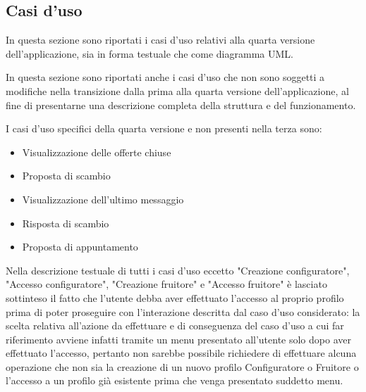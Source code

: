 \subsection{Casi d'uso}
In questa sezione sono riportati i casi d'uso relativi alla quarta versione dell'applicazione, sia in forma testuale che come diagramma UML.\bigskip 

In questa sezione sono riportati anche i casi d'uso che non sono soggetti a modifiche nella transizione dalla prima alla quarta versione dell'applicazione, al fine di presentarne una descrizione completa della struttura e del funzionamento.\bigskip

I casi d'uso specifici della quarta versione e non presenti nella terza sono:
\begin{itemize}
    \item Visualizzazione delle offerte chiuse
    \item Proposta di scambio
    \item Visualizzazione dell'ultimo messaggio
    \item Risposta di scambio
    \item Proposta di appuntamento
\end{itemize} \bigskip

Nella descrizione testuale di tutti i casi d'uso eccetto "Creazione configuratore", "Accesso configuratore", "Creazione fruitore" e "Accesso fruitore" è lasciato sottinteso il fatto che l'utente debba aver effettuato l'accesso al proprio profilo prima di poter proseguire con l'interazione descritta dal caso d'uso considerato: la scelta relativa all'azione da effettuare e di conseguenza del caso d'uso a cui far riferimento avviene infatti tramite un menu presentato all'utente solo dopo aver effettuato l'accesso, pertanto non sarebbe possibile richiedere di effettuare alcuna operazione che non sia la creazione di un nuovo profilo Configuratore o Fruitore o l'accesso a un profilo già esistente prima che venga presentato suddetto menu.\bigskip



